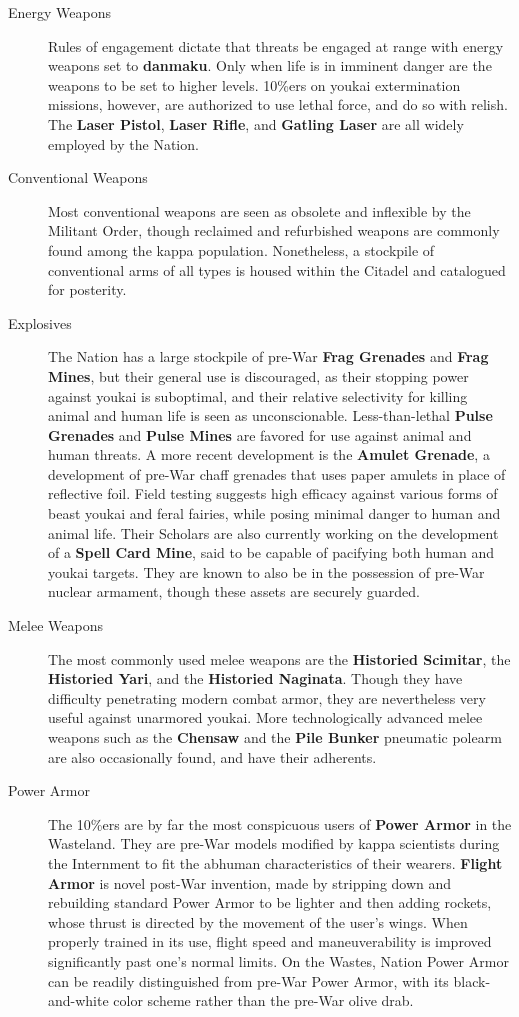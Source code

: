 \documentclass[a4paper,12pt]{book}
\begin{document}
\begin{description}
\item[Energy Weapons] Rules of engagement dictate that threats be engaged at range with energy weapons set to \textbf{danmaku}. Only when life is in imminent danger are the weapons to be set to higher levels. 10\%ers on youkai extermination missions, however, are authorized to use lethal force, and do so with relish. The \textbf{Laser Pistol}, \textbf{Laser Rifle}, and \textbf{Gatling Laser} are all widely employed by the Nation.
\item[Conventional Weapons] Most conventional weapons are seen as obsolete and inflexible by the Militant Order, though reclaimed and refurbished weapons are commonly found among the kappa population. Nonetheless, a stockpile of conventional arms of all types is housed within the Citadel and catalogued for posterity.
\item[Explosives] The Nation has a large stockpile of pre-War \textbf{Frag Grenades} and \textbf{Frag Mines}, but their general use is discouraged, as their stopping power against youkai is suboptimal, and their relative selectivity for killing animal and human life is seen as unconscionable. Less-than-lethal \textbf{Pulse Grenades} and \textbf{Pulse Mines} are favored for use against animal and human threats. A more recent development is the \textbf{Amulet Grenade}, a development of pre-War chaff grenades that uses paper amulets in place of reflective foil. Field testing suggests high efficacy against various forms of beast youkai and feral fairies, while posing minimal danger to human and animal life. Their Scholars are also currently working on the development of a \textbf{Spell Card Mine}, said to be capable of pacifying both human and youkai targets. They are known to also be in the possession of pre-War nuclear armament, though these assets are securely guarded.
\item[Melee Weapons] The most commonly used melee weapons are the \textbf{Historied Scimitar}, the \textbf{Historied Yari}, and the \textbf{Historied Naginata}. Though they have difficulty penetrating modern combat armor, they are nevertheless very useful against unarmored youkai. More technologically advanced melee weapons such as the \textbf{Chensaw} and the \textbf{Pile Bunker} pneumatic polearm are also occasionally found, and have their adherents.
\item[Power Armor] The 10\%ers are by far the most conspicuous users of \textbf{Power Armor} in the Wasteland. They are pre-War models modified by kappa scientists during the Internment to fit the abhuman characteristics of their wearers. \textbf{Flight Armor} is novel post-War invention, made by stripping down and rebuilding standard Power Armor to be lighter and then adding rockets, whose thrust is directed by the movement of the user's wings. When properly trained in its use, flight speed and maneuverability is improved significantly past one's normal limits. On the Wastes, Nation Power Armor can be readily distinguished from pre-War Power Armor, with its black-and-white color scheme rather than the pre-War olive drab.
\end{description}
\end{document}

